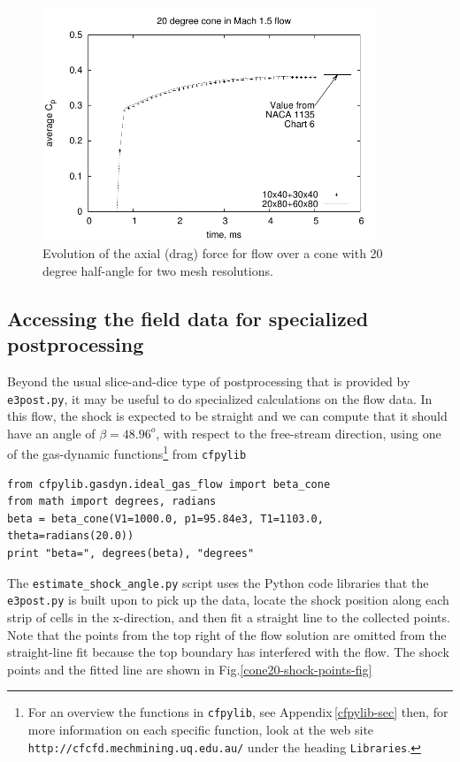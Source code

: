 \begin{figure}[htbp]
\begin{center}
\includegraphics[width=10cm]{../2D/cone20-simple/cone20_cp.pdf}
\end{center}
\caption{Evolution of the axial (drag) force
         for flow over a cone with 20 degree half-angle
	 for two mesh resolutions.}
\label{cone20-axial-force-fig}
\end{figure}

\subsection{Accessing the field data for specialized postprocessing}
%
Beyond the usual slice-and-dice type of postprocessing that is provided by \verb!e3post.py!, 
it may be useful to do specialized calculations on the flow data.
In this flow, the shock is expected to be straight and we can compute
that it should have an angle of $\beta = 48.96^o$, with respect to the free-stream direction,
using one of the gas-dynamic functions\footnote{For an overview the functions in \texttt{cfpylib}, 
see Appendix\,\ref{cfpylib-sec} then, for more information on each specific function,
look at the web site \texttt{http://cfcfd.mechmining.uq.edu.au/} under the heading \texttt{Libraries}.} 
from \verb!cfpylib!
\begin{verbatim}
from cfpylib.gasdyn.ideal_gas_flow import beta_cone
from math import degrees, radians
beta = beta_cone(V1=1000.0, p1=95.84e3, T1=1103.0, theta=radians(20.0))
print "beta=", degrees(beta), "degrees"
\end{verbatim}

The \texttt{estimate\_shock\_angle.py} script uses the Python code libraries 
that the \texttt{e3post.py} is built upon to pick up the data, 
locate the shock position along each strip of cells in the x-direction,
and then fit a straight line to the collected points.
Note that the points from the top right of the flow solution are omitted from the straight-line fit
because the top boundary has interfered with the flow.
The shock points and the fitted line are shown in Fig.\ref{cone20-shock-points-fig} 

